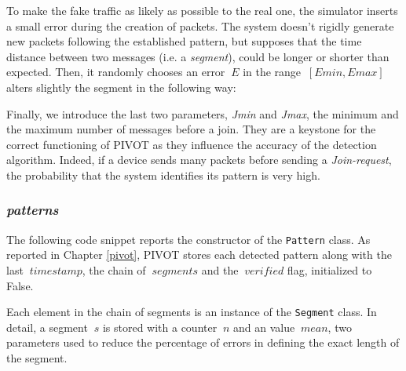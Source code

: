 \vspace{3mm}

\vspace{3mm}

To make the fake traffic as likely as possible to the real one, the simulator inserts a small error during the creation of packets. The system doesn't rigidly generate new packets following the established pattern, but supposes that the time distance between two messages (i.e. a \textit{segment}), could be longer or shorter than expected. Then, it randomly chooses an error \(\ E \) in the range \(\ [Emin, Emax] \) alters slightly the segment in the following way:

\vspace{3mm}

\vspace{3mm}

Finally, we introduce the last two parameters, \textit{Jmin} and \textit{Jmax}, the minimum and the maximum number of messages before a join. They are a keystone for the correct functioning of PIVOT as they influence the accuracy of the detection algorithm. Indeed, if a device sends many packets before sending a \textit{Join-request}, the probability that the system identifies its pattern is very high.

\vspace{3mm}

\vspace{3mm}

\subsubsection{\textit{patterns}}
The following code snippet reports the constructor of the \texttt{Pattern} class. As reported in Chapter \ref{pivot}, PIVOT stores each detected pattern along with the last \(\ timestamp \), the chain of \(\ segments \) and the \(\ verified \) flag, initialized to False.

\vspace{3mm}

\vspace{3mm}

Each element in the chain of segments is an instance of the \texttt{Segment} class. In detail, a segment \(\ s \) is stored with a counter \(\ n \) and an value \(\ mean \), two parameters used to reduce the percentage of errors in defining the exact length of the segment.

\vspace{3mm}

\vspace{3mm}

